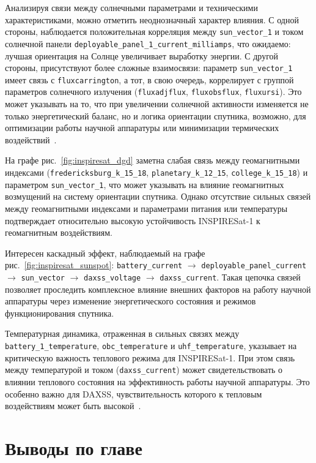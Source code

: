 Анализируя связи между солнечными параметрами и техническими характеристиками,
можно отметить неоднозначный характер влияния. С одной стороны, наблюдается
положительная корреляция между \texttt{sun\_vector\_1} и током солнечной панели
\texttt{deployable\_panel\_1\_current\_milliamps}, что ожидаемо: лучшая
ориентация на Солнце увеличивает выработку энергии. С другой стороны,
присутствуют более сложные взаимосвязи: параметр \texttt{sun\_vector\_1} имеет
связь с \texttt{fluxcarrington}, а тот, в свою очередь, коррелирует с группой
параметров солнечного излучения (\texttt{fluxadjflux}, \texttt{fluxobsflux},
\texttt{fluxursi}). Это может указывать на то, что при увеличении солнечной
активности изменяется не только энергетический баланс, но и логика ориентации
спутника, возможно, для оптимизации работы научной аппаратуры или минимизации
термических воздействий~\cite{nanosats_inspiresat}.

На графе рис.~\ref{fig:inspiresat_dgd}
заметна
слабая связь между геомагнитными индексами (\texttt{fredericksburg\_k\_15\_18},
\texttt{planetary\_k\_12\_15}, \texttt{college\_k\_15\_18}) и параметром
\texttt{sun\_vector\_1}, что может указывать на влияние геомагнитных возмущений
на систему ориентации спутника. Однако отсутствие сильных связей между
геомагнитными индексами и параметрами питания или температуры подтверждает
относительно высокую устойчивость INSPIRESat-1 к геомагнитным воздействиям.

Интересен каскадный эффект, наблюдаемый на графе
рис.~\ref{fig:inspiresat_sunspot}:
\texttt{battery\_current} $\rightarrow$
\texttt{deployable\_panel\_current} $\rightarrow$
\texttt{sun\_vector} $\rightarrow$
\texttt{daxss\_voltage} $\rightarrow$ \texttt{daxss\_current}.
Такая цепочка связей позволяет проследить комплексное влияние внешних факторов
на работу научной аппаратуры через изменение энергетического состояния и режимов
функционирования спутника.

Температурная динамика, отраженная в сильных связях между
\texttt{battery\_1\_temperature}, \texttt{obc\_temperature} и
\texttt{uhf\_temperature}, указывает на критическую важность теплового
режима для INSPIRESat-1. При этом связь между температурой и током
(\texttt{daxss\_current}) может свидетельствовать о влиянии теплового
состояния на эффективность работы научной аппаратуры. Это особенно важно для
DAXSS, чувствительность которого к тепловым воздействиям может быть
высокой~\cite{eoportal_inspiresat}.


\section{Выводы по главе}

